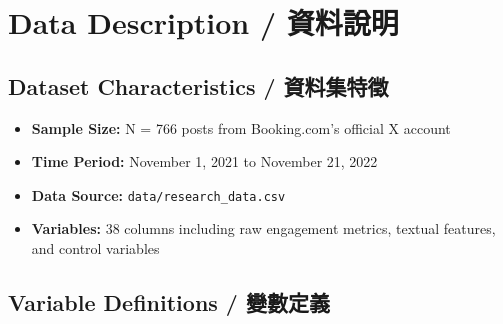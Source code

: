 \documentclass[12pt,a4paper,fontset=none]{ctexart}
\begin{document}
\section{Data Description / 資料說明}

\subsection{Dataset Characteristics / 資料集特徵}

\begin{itemize}
    \item \textbf{Sample Size:} N = 766 posts from Booking.com's official X account
    \item \textbf{Time Period:} November 1, 2021 to November 21, 2022
    \item \textbf{Data Source:} \texttt{data/research\_data.csv}
    \item \textbf{Variables:} 38 columns including raw engagement metrics, textual features, and control variables
\end{itemize}

\subsection{Variable Definitions / 變數定義}
\end{document}
